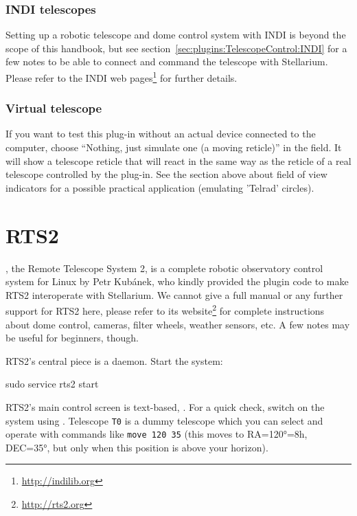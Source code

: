\subsubsection{INDI telescopes}
Setting up a robotic telescope and dome control system with INDI 
is beyond the scope of this handbook, but see section~\ref{sec:plugins:TelescopeControl:INDI} 
for a few notes to be able to connect and command the telescope with Stellarium.
Please refer to the INDI web pages\footnote{\url{http://indilib.org}} for further details.


\subsubsection{Virtual telescope}
If you want to test this plug-in without an actual device connected to
the computer, choose ``Nothing, just simulate one (a moving reticle)'' in
the  field. It will show a telescope reticle
that will react in the same way as the reticle of a real telescope
controlled by the plug-in.  See the section above about field of view
indicators for a possible practical application (emulating 'Telrad'
circles).  



\section{RTS2}
\label{sec:plugins:TelescopeControl:RTS2}

, the Remote Telescope System 2, is a complete robotic observatory control system for Linux 
by Petr Kub\'{a}nek, who kindly provided the plugin code to make RTS2 interoperate with Stellarium.
We cannot give a full manual or any further support for RTS2 here, please refer to its website\footnote{\url{http://rts2.org}} 
for complete instructions about dome control, cameras, filter wheels, weather sensors, etc. 
A few notes may be useful for beginners, though. 

RTS2's central piece is a daemon. Start the system:
\begin{commands}
sudo service rts2 start
\end{commands}
RTS2's main control screen is text-based, . For a quick check, switch on the system using . 
Telescope \texttt{T0} is a dummy telescope which you can select and operate with commands like \texttt{move 120 35} 
(this moves to RA=120°=8h, DEC=35°, but only when this position is above your horizon).

